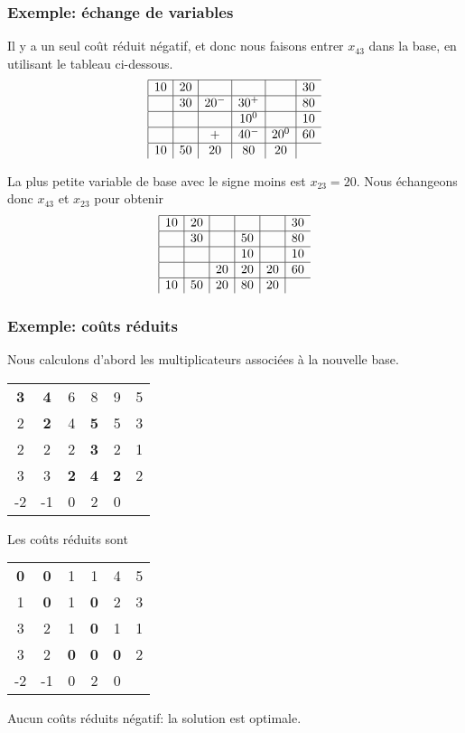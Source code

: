 \documentclass[usepdftitle=false]{beamer}
\begin{document}
\begin{frame}
\frametitle{Exemple: échange de variables}

Il y a un seul coût réduit négatif, et donc nous faisons entrer $x_{43}$ dans la base, en utilisant le tableau ci-dessous.
$$
\begin{array}{|c|c|c|c|c|c}
\hline
10 & 20 & & & & 30 \\
\hline
& 30 & 20^- & 30^+ & & 80 \\
\hline
& & & 10^0 & & 10 \\
\hline
& & + & 40^- & 20^0 & 60 \\
\hline
10 & 50 & 20 & 80 & 20 &
\end{array}
$$

La plus petite variable de base avec le signe moins est $x_{23} = 20$. Nous échangeons donc $x_{43}$ et $x_{23}$ pour obtenir
$$
\begin{array}{|c|c|c|c|c|c}
	\hline
	10 & 20 & & & & 30 \\
	\hline
	& 30 & & 50 & & 80 \\
	\hline
	& & & 10 & & 10 \\
	\hline
	& & 20 & 20 & 20 & 60 \\
	\hline
	10 & 50 & 20 & 80 & 20 &
\end{array}
$$

\end{frame}

\begin{frame}
\frametitle{Exemple: coûts réduits}

Nous calculons d'abord les multiplicateurs associées à la nouvelle base.
\begin{center}
	\begin{tabular}{ccccc|c}
		{\bf 3} & {\bf 4} & 6 & 8 & 9 & 5 \\
		2 & {\bf 2} & 4 & {\bf 5} & 5 & 3 \\
		2 & 2 & 2 & {\bf 3} & 2 & 1 \\
		3 & 3 & {\bf 2} & {\bf 4} & {\bf 2} & 2 \\
		\hline
		-2 & -1 & 0 & 2 & 0 & 
	\end{tabular}
\end{center}
Les coûts réduits sont
\begin{center}
	\begin{tabular}{ccccc|c}
		{\bf 0} & {\bf 0} & 1 & 1 & 4 & 5 \\
		1 & {\bf 0} & 1 & {\bf 0} & 2 & 3 \\
		3 & 2 & 1 & {\bf 0} & 1 & 1 \\
		3 & 2 & {\bf 0} & {\bf 0} & {\bf 0} & 2 \\
		\hline
		-2 & -1 & 0 & 2 & 0 & 
	\end{tabular}
\end{center}
Aucun coûts réduits négatif: la solution est optimale.

\end{frame}
\end{document}
